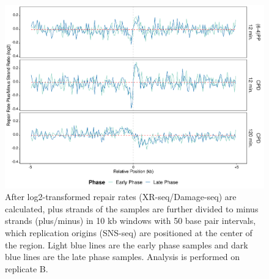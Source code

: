 \begin{figure}[H]
\begin{center}
\includegraphics[width=\textwidth]{Chapters/7_appendix/figures/supfig59}
\caption[Repair rate plus/minus ratio of replication origins in 10 kb (replicate B).]{After log2-transformed repair rates (XR-seq/Damage-seq) are calculated, plus strands of the samples are further divided to minus strands (plus/minus) in 10 kb windows with 50 base pair intervals, which replication origins (SNS-seq) are positioned at the center of the region. Light blue lines are the early phase samples and dark blue lines are the late phase samples. Analysis is performed on replicate B.}
\label{supfig:rrpm10snsB}
\end{center}
\end{figure}

